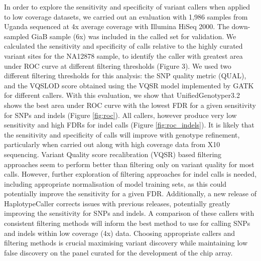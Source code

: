 In order to explore the sensitivity and specificity of variant callers when applied to low coverage datasets, we carried out an evaluation with 1,986 samples from Uganda sequenced at 4x average coverage with Illumina HiSeq 2000. The down-sampled GiaB sample\cite{Zook2014} (6x) was included in the called set for validation. We calculated the sensitivity and specificity of calls relative to the highly curated variant sites for the NA12878 sample, to identify the caller with greatest area under ROC curve at different filtering thresholds (Figure 3). We used two different filtering thresholds for this analysis: the SNP quality metric (QUAL), and the VQSLOD score obtained using the VQSR model implemented by GATK for different callers. With this evaluation, we show that UnifiedGenotyper3.2 shows the best area under ROC curve with the lowest FDR for a given sensitivity for SNPs and indels (Figure \ref{fig:roc}). All callers, however produce very low sensitivity and high FDRs for indel calls (Figure \ref{fig:roc_indels}). It is likely that the sensitivity and specificity of calls will improve with genotype refinement, particularly when carried out along with high coverage data from X10 sequencing. Variant Quality score recalibration (VQSR) based filtering approaches seem to perform better than filtering only on variant quality for most calls. However, further exploration of filtering approaches for indel calls is needed, including appropriate normalisation of model training sets, as this could potentially improve the sensitivity for a given FDR. Additionally, a new release of HaplotypeCaller corrects issues with previous releases, potentially greatly improving the sensitivity for SNPs and indels. A comparison of these callers with consistent filtering methods will inform the best method to use for calling SNPs and indels within low coverage (4x) data. Choosing appropriate callers and filtering methods is crucial maximising variant discovery while maintaining low false discovery on the panel curated for the development of the chip array.

